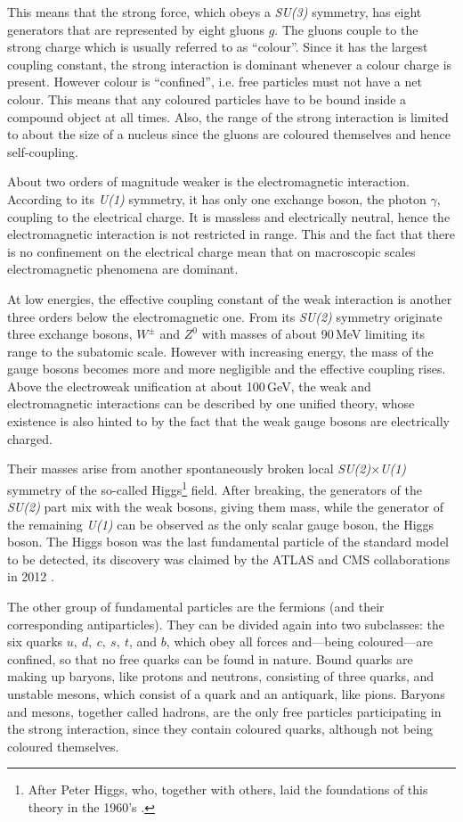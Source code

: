 This means that the strong force, which obeys a \emph{SU(3)} symmetry, has eight
generators that are represented by eight gluons $g$. The gluons couple to the
strong charge which is usually referred to as ``colour''. Since it has the
largest coupling constant, the strong interaction is dominant whenever a
colour charge is present. However colour is ``confined'', i.e. free particles
must not have a net colour. This means that any coloured particles have to be
bound inside a compound object at all times. Also, the range of the strong
interaction is limited to about the size of a nucleus since the gluons are
coloured themselves and hence self-coupling.

About two orders of magnitude weaker is the electromagnetic interaction.
According to its \emph{U(1)} symmetry, it has only one exchange boson, the
photon $\gamma$, coupling to the electrical charge. It is massless and
electrically neutral, hence the electromagnetic interaction is not restricted
in range. This and the fact that there is no confinement on the electrical
charge mean that on macroscopic scales electromagnetic phenomena are dominant.

At low energies, the effective coupling constant of the weak interaction is
another three orders below the electromagnetic one. From its \emph{SU(2)}
symmetry originate three exchange bosons, $W^\pm$ and $Z^0$ with masses of
about 90\,MeV limiting its range to the subatomic scale. However with increasing
energy, the mass of the gauge bosons becomes more and more negligible and the
effective coupling rises. Above the electroweak unification at about 100\,GeV,
the weak and electromagnetic interactions can be described by one unified
theory, whose existence is also hinted to by the fact that the weak gauge
bosons are electrically charged.

Their masses arise from another spontaneously
broken local \emph{SU(2)}$\times$\emph{U(1)} symmetry of the so-called
Higgs\footnote{After Peter Higgs, who, together with others, laid the
foundations of this theory in the 1960's \cite{Higgs, BroutEnglert}.} field.
After breaking, the generators of the \emph{SU(2)} part mix with the weak
bosons, giving them mass, while the generator of the remaining \emph{U(1)} can
be observed as the only scalar gauge boson, the Higgs boson. The Higgs boson
was the last fundamental particle of the standard model to be detected, its
discovery was claimed by the ATLAS and CMS collaborations in 2012
\cite{AtlasHiggs, CMSHiggs}.

The other group of fundamental particles are the fermions (and their
corresponding antiparticles). They can be divided again into two subclasses: the
six quarks $u,\ d,\ c,\ s,\ t$, and $b$, which obey all forces and---being
coloured---are confined, so that no free quarks can be found in nature. Bound
quarks are making up baryons, like protons and neutrons, consisting of three
quarks, and unstable mesons, which consist of a quark and an antiquark, like
pions. Baryons and mesons, together called hadrons, are the only free particles
participating in the strong interaction, since they contain coloured quarks,
although not being coloured themselves.

